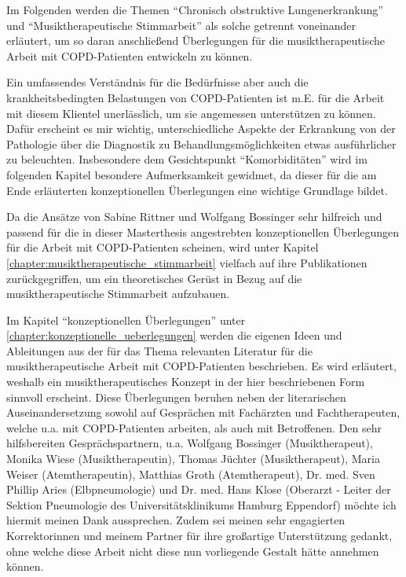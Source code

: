 Im Folgenden werden die Themen "`Chronisch obstruktive Lungenerkrankung"' und "`Musiktherapeutische Stimmarbeit"' als solche getrennt voneinander erläutert, um so daran anschließend Überlegungen für die musiktherapeutische Arbeit mit COPD-Patienten entwickeln zu können.

Ein umfassendes Verständnis für die Bedürfnisse aber auch die krankheitsbedingten Belastungen von COPD-Patienten ist m.E. für die Arbeit mit diesem Klientel unerlässlich, um sie angemessen unterstützen zu können. Dafür erscheint es mir wichtig, unterschiedliche Aspekte der Erkrankung von der Pathologie über die Diagnostik zu Behandlungsmöglichkeiten etwas ausführlicher zu beleuchten. Insbesondere dem Gesichtspunkt "`Komorbiditäten"' wird im folgenden Kapitel besondere Aufmerksamkeit gewidmet, da dieser für die am Ende erläuterten konzeptionellen Überlegungen eine wichtige Grundlage bildet.

Da die Ansätze von Sabine Rittner und Wolfgang Bossinger sehr hilfreich und passend für die in dieser Masterthesis angestrebten konzeptionellen Überlegungen für die Arbeit mit COPD-Patienten scheinen, wird unter Kapitel  \ref{chapter:musiktherapeutische_stimmarbeit} vielfach auf ihre Publikationen zurückgegriffen, um ein theoretisches Gerüst in Bezug auf die musiktherapeutische Stimmarbeit aufzubauen.

Im Kapitel "`konzeptionellen Überlegungen"' unter \ref{chapter:konzeptionelle_ueberlegungen} werden die eigenen Ideen und Ableitungen aus der für das Thema relevanten Literatur für die musiktherapeutische Arbeit mit COPD-Patienten beschrieben. Es wird erläutert, weshalb ein musiktherapeutisches Konzept in der hier beschriebenen Form sinnvoll erscheint. Diese Überlegungen beruhen neben der literarischen Auseinandersetzung sowohl auf Gesprächen mit Fachärzten und Fachtherapeuten, welche u.a. mit COPD-Patienten arbeiten, als auch mit Betroffenen. Den sehr hilfsbereiten Gesprächspartnern, u.a. Wolfgang Bossinger (Musiktherapeut), Monika Wiese (Musiktherapeutin), Thomas Jüchter (Musiktherapeut), Maria Weiser (Atemtherapeutin), Matthias Groth (Atemtherapeut), Dr. med. Sven Phillip Aries (Elbpneumologie) und Dr. med. Hans Klose (Oberarzt - Leiter der Sektion Pneumologie des Universitätsklinikums Hamburg Eppendorf) möchte ich hiermit meinen Dank aussprechen. Zudem sei meinen sehr engagierten Korrektorinnen und meinem Partner für ihre großartige Unterstützung gedankt, ohne welche diese Arbeit nicht diese nun vorliegende Gestalt hätte annehmen können.

\newpage\thispagestyle{empty}